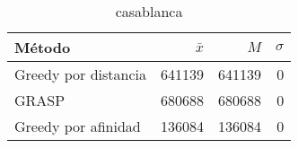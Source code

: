 \begin{table}[h!]
\centering
\begin{tabular}{|l|r|r|r|}
\hline
              Método &  $\bar{x}$ &    $M$ &  $\sigma$ \\
\hline
Greedy por distancia &     641139 & 641139 &         0 \\
               GRASP &     680688 & 680688 &         0 \\
 Greedy por afinidad &     136084 & 136084 &         0 \\
\hline
\end{tabular}
\caption{casablanca}
\label{casablanca}
\end{table}
